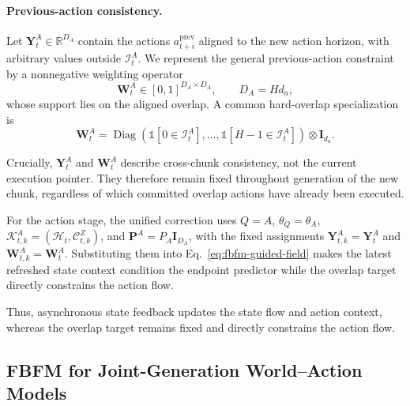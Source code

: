 \paragraph{Previous-action consistency.}

Let $\mathbf Y_t^A\in\mathbb R^{D_A}$ contain the actions
$a_{t+i}^{\mathrm{prev}}$ aligned to the new action horizon, with arbitrary values
outside $\mathcal I_t^A$. We represent the general previous-action constraint by a
nonnegative weighting operator
\begin{equation}
    \mathbf W_t^A\in[0,1]^{D_A\times D_A},
    \qquad D_A=H d_a,
    \label{eq:general-action-weight}
\end{equation}
whose support lies on the aligned overlap. A common hard-overlap specialization is
\begin{equation}
    \mathbf W_t^A
    =
    \operatorname{Diag}
    \!\left(
        \mathbb 1[0\in\mathcal I_t^A],\ldots,
        \mathbb 1[H-1\in\mathcal I_t^A]
    \right)
    \otimes\mathbf I_{d_a}.
    \label{eq:hard-overlap-action-mask}
\end{equation}

Crucially, $\mathbf Y_t^A$ and $\mathbf W_t^A$ describe cross-chunk consistency,
not the current execution pointer. They therefore remain fixed throughout generation
of the new chunk, regardless of which committed overlap actions have already been
executed.

For the action stage, the unified correction uses
$Q=A$, $\theta_Q=\theta_A$,
$\mathcal K_{t,k}^A=(\mathcal H_t,\mathcal C_{t,k}^Z)$, and
$\mathbf P^A=P_A\mathbf I_{D_A}$, with the fixed assignments
$\mathbf Y_{t,k}^A=\mathbf Y_t^A$ and
$\mathbf W_{t,k}^A=\mathbf W_t^A$. Substituting them into
Eq.~\eqref{eq:fbfm-guided-field} makes the
latest refreshed state context condition the endpoint predictor while the overlap
target directly constrains the action flow.

Thus, asynchronous state feedback updates the state flow and action context,
whereas the overlap target remains fixed and directly constrains the action flow.

\subsection{FBFM for Joint-Generation World--Action Models}
\label{sec:method:joint}

